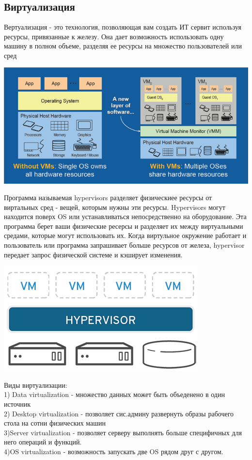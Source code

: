\documentclass[a4paper,14pt]{extarticle}
\begin{document}
\subsection{Виртуализация}
Вертуализация\cite{virt} - это технология, позволяющая вам создать ИТ сервит используя ресурсы, привязанные к железу. Она дает возможность использовать одну машину в полном объеме, разделяя ее ресурсы на множество пользователей или сред
\begin{center}
  \includegraphics{img/virtualization.png}
\end{center}
Программа называемая hypervisors разделяет физическиее ресурсы от виртальных сред - вещей, которым нужны эти ресурсы. Hypervisors могут находится поверх OS или устанавливаться непосредственно на оборудование. Эта программа берет ваши физические ресерсы и разделяет их между виртуальными средами, которые могут использовать их. Когда виртульное окружение работает и пользователь или программа запрашивает больше ресурсов от железа, hypervisor передает запрос физической системе и кэширует изменения.\\
\begin{center}
  \includegraphics[scale=0.7]{img/how-virtualization-works.png}\\
\end{center}
Виды виртуализации:\\
1) Data virtualization - множество данных может быть объеденено в один источник\\
2) Desktop virtualization - позволяет сис.админу развернуть образы рабочего стола на сотни физических машин\\
3)Server virtualization - позволяет серверу выполнять больше специфичных для него операций и функций.\\
4)OS virtualization - возможность запускать две OS рядом друг с другом.\\
\newpage
\end{document}

